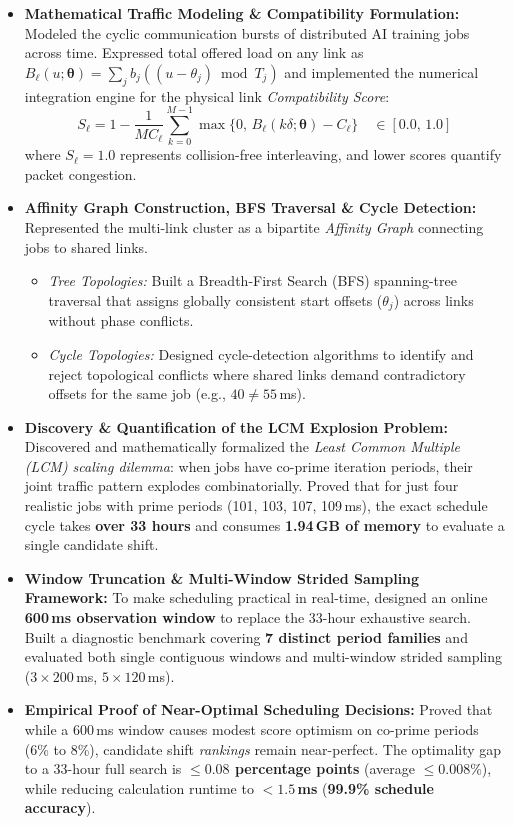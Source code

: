 \documentclass[11pt,a4paper]{article}
\begin{document}
\begin{itemize}[leftmargin=1.2em, itemsep=3.5pt]
    \item \textbf{Mathematical Traffic Modeling \& Compatibility Formulation:}
    Modeled the cyclic communication bursts of distributed AI training jobs across time. Expressed total offered load on any link as $B_\ell(u;\boldsymbol{\theta}) = \sum_{j} b_j((u - \theta_j) \bmod T_j)$ and implemented the numerical integration engine for the physical link \emph{Compatibility Score}:
    \[
    S_\ell = 1 - \frac{1}{M C_\ell} \sum_{k=0}^{M-1} \max\big\{0,\, B_\ell(k\delta;\boldsymbol{\theta}) - C_\ell\big\} \quad \in [0.0,\, 1.0]
    \]
    where $S_\ell = 1.0$ represents collision-free interleaving, and lower scores quantify packet congestion.

    \item \textbf{Affinity Graph Construction, BFS Traversal \& Cycle Detection:}
    Represented the multi-link cluster as a bipartite \emph{Affinity Graph} connecting jobs to shared links.
    \begin{itemize}[itemsep=1pt, topsep=1pt]
        \item \emph{Tree Topologies:} Built a Breadth-First Search (BFS) spanning-tree traversal that assigns globally consistent start offsets ($\theta_j$) across links without phase conflicts.
        \item \emph{Cycle Topologies:} Designed cycle-detection algorithms to identify and reject topological conflicts where shared links demand contradictory offsets for the same job (e.g., $40 \neq 55$\,ms).
    \end{itemize}

    \item \textbf{Discovery \& Quantification of the LCM Explosion Problem:}
    Discovered and mathematically formalized the \emph{Least Common Multiple (LCM) scaling dilemma}: when jobs have co-prime iteration periods, their joint traffic pattern explodes combinatorially. Proved that for just four realistic jobs with prime periods (101, 103, 107, 109\,ms), the exact schedule cycle takes \textbf{over 33 hours} and consumes \textbf{1.94\,GB of memory} to evaluate a single candidate shift.

    \item \textbf{Window Truncation \& Multi-Window Strided Sampling Framework:}
    To make scheduling practical in real-time, designed an online \textbf{600\,ms observation window} to replace the 33-hour exhaustive search. Built a diagnostic benchmark covering \textbf{7 distinct period families} and evaluated both single contiguous windows and multi-window strided sampling ($3\times 200$\,ms, $5\times 120$\,ms).

    \item \textbf{Empirical Proof of Near-Optimal Scheduling Decisions:}
    Proved that while a 600\,ms window causes modest score optimism on co-prime periods (6\% to 8\%), candidate shift \emph{rankings} remain near-perfect. The optimality gap to a 33-hour full search is \textbf{$\le 0.08$ percentage points} (average $\le 0.008$\%), while reducing calculation runtime to \textbf{$< 1.5$\,ms} (\textbf{99.9\% schedule accuracy}).
\end{itemize}
\end{document}
